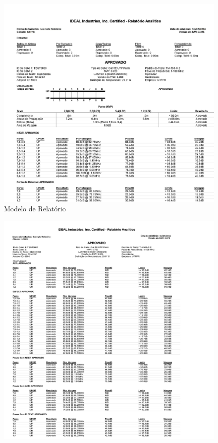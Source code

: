 \documentclass[	DIV=calc,%
paper=a4,%
fontsize=12pt,%
onecolumn]{scrartcl}	 					%
\begin{document}
	\begin{figure}[!h]
		\centering
		\caption{Modelo de Relatório}
		\includegraphics{relat_1}
	\end{figure}
	\begin{figure}[!h]
		\centering
		\includegraphics{relat_2}
	\end{figure}
	
\end{document}
